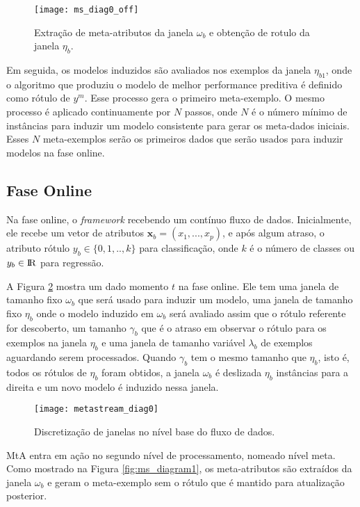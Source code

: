 \begin{figure}[ht]
    \centering
    \texttt{[image: ms\_diag0\_off]}
    \caption{Extração de meta-atributos da janela $\omega_b$ e obtenção de
    rotulo da janela $\eta_b$.}
    \label{fig:ms_diag0_off}
\end{figure}

Em seguida, os modelos induzidos são avaliados nos exemplos da janela
$\eta_{b1}$, onde o algoritmo que produziu o modelo de melhor performance
preditiva é definido como rótulo de $y^m$. Esse processo gera o primeiro
meta-exemplo. O mesmo processo é aplicado continuamente por $N$ passos, onde
$N$ é o número mínimo de instâncias para induzir um modelo consistente para
gerar os meta-dados iniciais. Esses $N$ meta-exemplos serão os primeiros dados
que serão usados para induzir modelos na fase online.

\subsection{Fase Online}
\label{subsec:online}

Na fase online, o \textit{framework} recebendo um contínuo fluxo de dados.
Inicialmente, ele recebe um vetor de atributos $\boldsymbol{x}_b =
(x_1,...,x_p)$, e após algum atraso, o atributo rótulo $y_b \in \{0,1,..,k\}$
para classificação, onde $k$ é o número de classes ou $y_b \in \rm{I\!R}$ para
regressão.

A Figura \ref{fig:ms_diagram0} mostra um dado momento $t$ na fase online. Ele
tem uma janela de tamanho fixo $\omega_b$ que será usado para induzir um
modelo, uma janela de tamanho fixo $\eta_b$ onde o modelo induzido em
$\omega_b$ será avaliado assim que o rótulo referente for descoberto, um
tamanho $\gamma_b$ que é o atraso em observar o rótulo para os exemplos na
janela $\eta_b$ e uma janela de tamanho variável $\lambda_b$ de exemplos
aguardando serem processados.
Quando $\gamma_b$ tem o mesmo tamanho que $\eta_b$, isto é, todos os rótulos de
$\eta_b$ foram obtidos, a janela $\omega_b$ é deslizada $\eta_b$ instâncias
para a direita e um novo modelo é induzido nessa janela.

\begin{figure}[ht]
    \centering
    \texttt{[image: metastream\_diag0]}
    \caption{Discretização de janelas no nível base do fluxo de dados.}
    \label{fig:ms_diagram0}
\end{figure}

MtA entra em ação no segundo nível de processamento, nomeado nível meta. Como
mostrado na Figura \ref{fig:ms_diagram1}, os meta-atributos são extraídos da
janela $\omega_b$ e geram o meta-exemplo sem o rótulo que é mantido para
atualização posterior.

